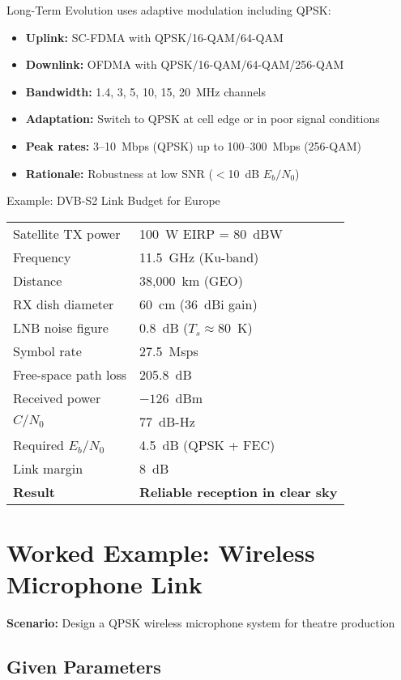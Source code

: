 Long-Term Evolution uses adaptive modulation including QPSK:
\begin{itemize}
\item \textbf{Uplink:} SC-FDMA with QPSK/16-QAM/64-QAM
\item \textbf{Downlink:} OFDMA with QPSK/16-QAM/64-QAM/256-QAM
\item \textbf{Bandwidth:} 1.4, 3, 5, 10, 15, 20~MHz channels
\item \textbf{Adaptation:} Switch to QPSK at cell edge or in poor signal conditions
\item \textbf{Peak rates:} 3--10~Mbps (QPSK) up to 100--300~Mbps (256-QAM)
\item \textbf{Rationale:} Robustness at low SNR ($<$10~dB $E_b/N_0$)
\end{itemize}

\begin{calloutbox}[colback=black!5!white,colframe=black]{Example: DVB-S2 Link Budget for Europe}
\begin{tabular}{@{}ll@{}}
Satellite TX power & 100~W EIRP = 80~dBW \\
Frequency & 11.5~GHz (Ku-band) \\
Distance & 38,000~km (GEO) \\
RX dish diameter & 60~cm (36~dBi gain) \\
LNB noise figure & 0.8~dB ($T_s \approx 80$~K) \\
Symbol rate & 27.5~Msps \\
\midrule
Free-space path loss & 205.8~dB \\
Received power & $-126$~dBm \\
$C/N_0$ & 77~dB-Hz \\
Required $E_b/N_0$ & 4.5~dB (QPSK + FEC) \\
Link margin & 8~dB \\
\midrule
\textbf{Result} & \textbf{Reliable reception in clear sky} \\
\end{tabular}
\end{calloutbox}

\section{Worked Example: Wireless Microphone Link}

\textbf{Scenario:} Design a QPSK wireless microphone system for theatre production

\subsection*{Given Parameters}

